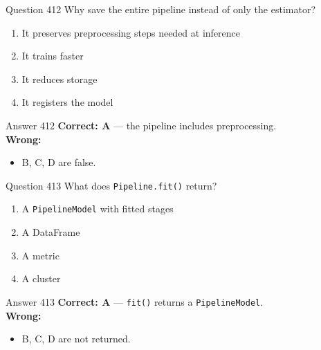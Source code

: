 \documentclass[aspectratio=169,11pt]{beamer}
\begin{document}
	\begin{frame}{Question 412}
		Why save the entire pipeline instead of only the estimator?
		\begin{enumerate}[label=\Alph*.]
			\item It preserves preprocessing steps needed at inference
			\item It trains faster
			\item It reduces storage
			\item It registers the model
		\end{enumerate}
	\end{frame}
	\begin{frame}{Answer 412}
		\textbf{Correct: A} --- the pipeline includes preprocessing.\\
		\vspace{0.5em}
		\textbf{Wrong:}
		\begin{itemize}
			\item B, C, D are false.
		\end{itemize}
	\end{frame}
	
	\begin{frame}{Question 413}
		What does \texttt{Pipeline.fit()} return?
		\begin{enumerate}[label=\Alph*.]
			\item A \texttt{PipelineModel} with fitted stages
			\item A DataFrame
			\item A metric
			\item A cluster
		\end{enumerate}
	\end{frame}
	\begin{frame}{Answer 413}
		\textbf{Correct: A} --- \texttt{fit()} returns a \texttt{PipelineModel}.\\
		\vspace{0.5em}
		\textbf{Wrong:}
		\begin{itemize}
			\item B, C, D are not returned.
		\end{itemize}
	\end{frame}
	
\end{document}

